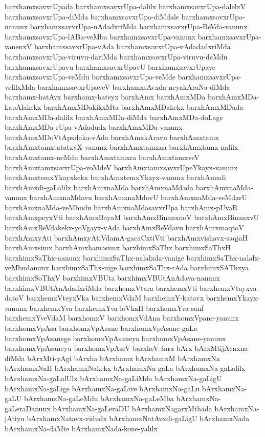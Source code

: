 {barxhamxsavxrUpada
barxhamxsavxrUpa-dalilx
barxhamxsavxrUpa-dalelxV
barxhamxsavxrUpa-diMda
barxhamxsavxrUpa-diMdale
barxhamxsavxrUpa-nanunx
barxhamxsavxrUpa-nAdadxriMda
barxhamxsavxrUpa-BeVda-vanunx
barxhamxsavxrUpa-lABa-veMba
barxhamxsavxrUpa-vanunx
barxhamxsavxrUpa-vanenxV
barxhamxsavxrUpa-vAda
barxhamxsavxrUpa-vAdadadxriMda
barxhamxsavxrUpa-viruvu-dariMda
barxhamxsavxrUpa-viruvu-deMdu
barxhamxsavxrUpavu
barxhamxsavxrUpavU
barxhamxsavxrUpave
barxhamxsavxrUpa-veMdu
barxhamxsavxrUpa-veMde
barxhamxsavxrUpa-velilxMda
barxhamxsavxrUpaveV
barxhamxsAvxda-neyakAraNa-diMda
barxhamx-hatAyx
barxhamx-hateyx
barxhAmx
barxhAmxMDa
barxhAmxMDa-kapAlakekx
barxhAmxMDakikxMta
barxhAmxMDakekx
barxhAmxMDada
barxhAmxMDa-dalilx
barxhAmxMDa-diMda
barxhAmxMDa-doLage
barxhAmxMDa-rUpa-vAdadudx
barxhAmxMDa-vanunx
barxhAmxMDoVtApxdaka-vAda
barxhAmxkAravu
barxhAmxtamx
barxhAmxtamxtatatxvX-vanunx
barxhAmxtamxna
barxhAmxtamx-nalilx
barxhAmxtamx-neMdu
barxhAmxtamxra
barxhAmxtamxveV
barxhAmxtamxsavxrUpa-voMdeV
barxhAmxtamxsavxrUpeYkayx-vanunx
barxhAmxtemxYkayxkekx
barxhAmxtemxYkayx-vanunx
barxhAmxdi
barxhAmxdi-gaLalilx
barxhAmxnaMda
barxhAmxnaMdada
barxhAmxnaMda-vanunx
barxhAmxnaMdavu
barxhAmxnaMdavU
barxhAmxnaMda-veMdarU
barxhAmxnaMda-veMbudu
barxhAmxnaMdasavxrUpa
barxhAmx-pUvaR
barxhAmxpeyxVti
barxhAmxBayaM
barxhAmxBinanxnoV
barxhAmxBinanxvU
barxhAmxBeVdakekx-yoVgayx-vAda
barxhAmxBeVdavu
barxhAmxmaqtoV
barxhAmxyAti
barxhAmxyAtiVdamA-gacaCxtiVti
barxhAmxvishavx-saqjaH
barxhAmxsimx
barxhAmxhamasimx
barxhimxSaThx
barxhimxSaThxH
barxhimxSaThx-nanunx
barxhimxSaThx-nalalxda-vanige
barxhimxSaThx-nalalx-veMbudanunx
barxhimxSaThx-nige
barxhimxSaThx-rAda
barxhimxSAThxya
barxhimxSoThxV
barxhimxVBUta
barxhimxVBUtAnAdava-nanunx
barxhimxVBUtAnAdadxriMda
barxhemxVtara
barxhemxVti
barxhemxVtayxva-datoV
barxhemxVteyxVka
barxhemxVdaM
barxhemxY-katavx
barxhemxYkayx-vanunx
barxhemxYva
barxhemxYva-loVkaH
barxhemxYva-sanf
barxhemxYveVdaM
barxhomxV
barxhomxVdAna
barxhomxVpane-yanunx
barxhomxVpAsa
barxhomxVpAsane
barxhomxVpAsane-gaLa
barxhomxVpAsanege
barxhomxVpAsaneya
barxhomxVpAsane-yanunx
barxhomxVpAsaneyu
barxhomxVpAseV
barxheV-tara
bArx
bArxMtijAcnxna-diMda
bArxMti-yAgi
bArxha
bArxhamx
bArxhamxM
bArxhamxNa
bArxhamxNaH
bArxhamxNakekx
bArxhamxNa-gaLa
bArxhamxNa-gaLalilx
bArxhamxNa-gaLalUlx
bArxhamxNa-gaLiMda
bArxhamxNa-gaLigU
bArxhamxNa-gaLige
bArxhamxNa-gaLive
bArxhamxNa-gaLu
bArxhamxNa-gaLU
bArxhamxNa-gaLeMdu
bArxhamxNa-gaLeMba
bArxhamxNa-gaLeraDanunx
bArxhamxNa-gaLeraDU
bArxhamxNagarxMthada
bArxhamxNa-jAtiyu
bArxhamxNatavx-vidudx
bArxhamxNatAvxdi-gaLigU
bArxhamxNada
bArxhamxNa-daMte
bArxhamxNada-kone-yalilx
}
